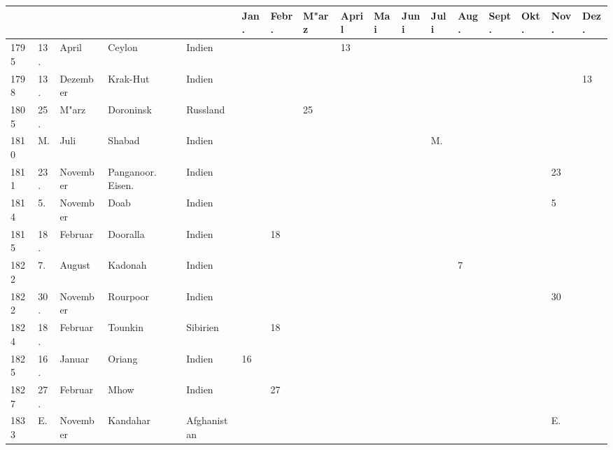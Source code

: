 \documentclass[a4paper, 8pt, oneside, polutonikogreek, german]{article}
\begin{document}
\section{}
\vspace*{\fill}
\clearpage
\begin{landscape}
\begin{table}[H]
    \centering
    \swabfamily
    \footnotesize
    \begin{longtable}{|l|l|l|l|l|l|l|l|l|l|l|l|l|l|l|l|l|}
    \hline
         & & & & & Jan. & Febr. & M"arz & April & Mai & Juni & Juli & Aug. & Sept. & Okt. & Nov. & Dez. \\ \hline
        1795 & 13. & April & Ceylon & Indien & ~ & ~ & ~ & 13 & ~ & ~ & ~ & ~ & ~ & ~ & ~ & ~ \\ \hline
        1798 & 13. & Dezember & Krak-Hut & Indien & ~ & ~ & ~ & ~ & ~ & ~ & ~ & ~ & ~ & ~ & ~ & 13 \\ \hline
        1805 & 25. & M"arz & Doroninsk & Russland & ~ & ~ & 25 & ~ & ~ & ~ & ~ & ~ & ~ & ~ & ~ & ~ \\ \hline
        1810 & M. & Juli & Shabad & Indien & ~ & ~ & ~ & ~ & ~ & ~ & M. & ~ & ~ & ~ & ~ & ~ \\ \hline
        1811 & 23. & November & Panganoor. Eisen. & Indien & ~ & ~ & ~ & ~ & ~ & ~ & ~ & ~ & ~ & ~ & 23 & ~ \\ \hline
        1814 & 5. & November & Doab & Indien & ~ & ~ & ~ & ~ & ~ & ~ & ~ & ~ & ~ & ~ & 5 & ~ \\ \hline
        1815 & 18. & Februar & Dooralla & Indien & ~ & 18 & ~ & ~ & ~ & ~ & ~ & ~ & ~ & ~ & ~ & ~ \\ \hline
        1822 & 7. & August & Kadonah & Indien & ~ & ~ & ~ & ~ & ~ & ~ & ~ & 7 & ~ & ~ & ~ & ~ \\ \hline
        1822 & 30. & November & Rourpoor & Indien & ~ & ~ & ~ & ~ & ~ & ~ & ~ & ~ & ~ & ~ & 30 & ~ \\ \hline
        1824 & 18. & Februar & Tounkin & Sibirien & ~ & 18 & ~ & ~ & ~ & ~ & ~ & ~ & ~ & ~ & ~ & ~ \\ \hline
        1825 & 16. & Januar & Oriang & Indien & 16 & ~ & ~ & ~ & ~ & ~ & ~ & ~ & ~ & ~ & ~ & ~ \\ \hline
        1827 & 27. & Februar & Mhow & Indien & ~ & 27 & ~ & ~ & ~ & ~ & ~ & ~ & ~ & ~ & ~ & ~ \\ \hline
        1833 & E. & November & Kandahar & Afghanistan & ~ & ~ & ~ & ~ & ~ & ~ & ~ & ~ & ~ & ~ & E. & ~ \\ \hline

\end{longtable}
\end{table}
\end{landscape}
\end{document}
